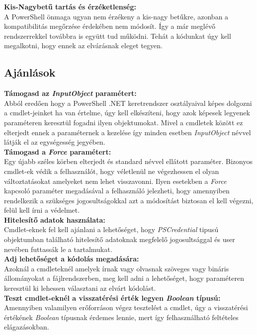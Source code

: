 \documentclass[12pt,oneside,justify,table]{book}
\begin{document}
\noindent \textbf{Kis-Nagybetű tartás és érzéketlenség:}\\
A PowerShell önmaga ugyan nem érzékeny a kis-nagy betűkre, azonban a kompatibilitás megőrzése érdekében nem módosít. Így a már meglévő rendszerrekkel továbbra is együtt tud működni. Tehát a kódunkat úgy kell megalkotni, hogy ennek az elvárásnak eleget tegyen.

\subsection{Ajánlások}
\noindent \textbf{Támogasd az \textit{InputObject} paramétert:}\\
Abból eredően hogy a PowerShell .NET keretrendszer osztályaival képes dolgozni a cmdlet-jeinket ha van értelme, úgy kell elkészíteni, hogy azok képesek legyenek paraméteren keresztül fogadni ilyen objektumokat. Mivel a cmdletek között ez elterjedt ennek a paraméternek a kezelése így minden esetben \textit{InputObject} névvel látják el az egységesség jegyében. \\

\noindent \textbf{Támogasd a \textit{Force} paramétert:} \\
Egy újabb széles körben elterjedt és standard névvel ellátott paraméter. Bizonyos cmdlet-ek védik a felhasználót, hogy véletlenül ne végezhessen el olyan változtatásokat amelyeket nem lehet visszavonni. Ilyen esetekben a \textit{Force} kapcsoló paraméter megadásával a felhasználó jelezheti, hogy amennyiben rendelkezik a szükséges jogosultságokkal azt a módosítást biztosan el kell végezni, felül kell írni a védelmet. \\

\noindent \textbf{Hitelesítő adatok használata:} \\
Cmdlet-eknek fel kell ajánlani a lehetőséget, hogy \textit{PSCredential} tipusú objektumban található hitelesítő adatoknak megfelelő jogosultsággal és user nevében futtassák le a tartalmukat. \\

\noindent \textbf{Adj lehetőséget a kódolás megadására:} \\
Azoknál a cmdleteknél amelyek írnak vagy olvasnak szöveges vagy bináris állományokat a fájlrendszerben, meg kell adni a lehetőséget, hogy paraméteren keresztül ki lehessen választani az elvárt kódolást. \\

\noindent \textbf{Teszt cmdlet-eknél a visszatérési érték legyen \textit{Boolean} típusú:} \\
Amennyiben valamilyen erőforráson végez tesztelést a cmdlet, úgy a visszatérési értékének \textit{Boolean} típusnak érdemes lennie, mert így felhasználható feltételes elágazásokban. \\
\end{document}
